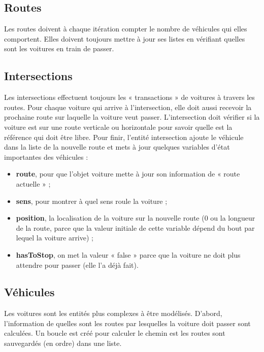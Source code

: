 \documentclass[12pt]{article} %
\begin{document}
\subsection{Routes}
Les routes doivent à chaque itération compter le nombre de véhicules qui elles comportent. Elles doivent toujours mettre à jour ses listes en vérifiant quelles sont les voitures en train de passer.

\subsection{Intersections}
Les intersections effectuent toujours les « transactions » de voitures à travers les routes. Pour chaque voiture qui arrive à l'intersection, elle doit aussi recevoir la prochaine route sur laquelle la voiture veut passer. L'intersection doit vérifier si la voiture est sur une route verticale ou horizontale pour savoir quelle est la référence qui doit être libre. Pour finir, l'entité intersection ajoute le véhicule dans la liste de la nouvelle route et mets à jour quelques variables d'état importantes des véhicules :
\begin{itemize}
\item \textbf{route}, pour que l'objet voiture mette à jour son information de « route actuelle » ;\\

\item \textbf{sens}, pour montrer à quel sens roule la voiture ;\\

\item \textbf{position}, la localisation de la voiture sur la nouvelle route (0 ou la longueur de la route, parce que la valeur initiale de cette variable dépend du bout par lequel la voiture arrive) ;\\

\item \textbf{hasToStop}, on met la valeur « false » parce que la voiture ne doit plus attendre pour passer (elle l'a déjà fait).
\end{itemize} 

\subsection{Véhicules}
Les voitures sont les entités plus complexes à être modélisés. 
%
D'abord, l'information de quelles sont les routes par lesquelles la voiture doit passer sont calculées. Un boucle est créé pour calculer le chemin est les routes sont sauvegardés (en ordre) dans une liste.
\end{document}
